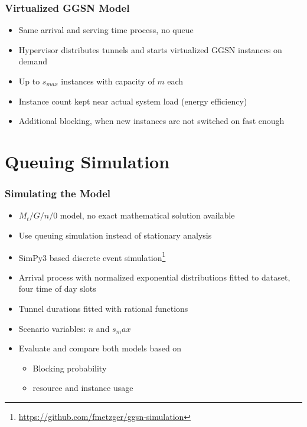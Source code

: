 \documentclass{beamer}
\begin{document}
\begin{frame}
	\frametitle{Virtualized GGSN Model}
		\begin{center}
		\resizebox{!}{3cm}{%
			
		}
		\end{center}

		\begin{itemize}
			\item Same arrival and serving time process, no queue
			\item Hypervisor distributes tunnels and starts virtualized GGSN instances on demand
			\item Up to $s_{max}$ instances with capacity of $m$ each
			\item Instance count kept near actual system load (energy efficiency)
			\item Additional blocking, when new instances are not switched on fast enough
		\end{itemize}
\end{frame}


\section{Queuing Simulation}


\begin{frame}
	\frametitle{Simulating the Model}

	\begin{itemize}
		\item $M_t/G/n/0$ model, no exact mathematical solution available
		\item Use queuing simulation instead of stationary analysis
		\item SimPy3 based discrete event simulation\footnote{\url{https://github.com/fmetzger/ggsn-simulation}}
		\item Arrival process with normalized exponential distributions fitted to dataset, four time of day slots
		\item Tunnel durations fitted with rational functions
		\item Scenario variables: $n$ and $s_max$
		\item Evaluate and compare both models based on
		\begin{itemize}
			\item Blocking probability
			\item resource and instance usage
		\end{itemize}
	\end{itemize}

\end{frame}
\end{document}
